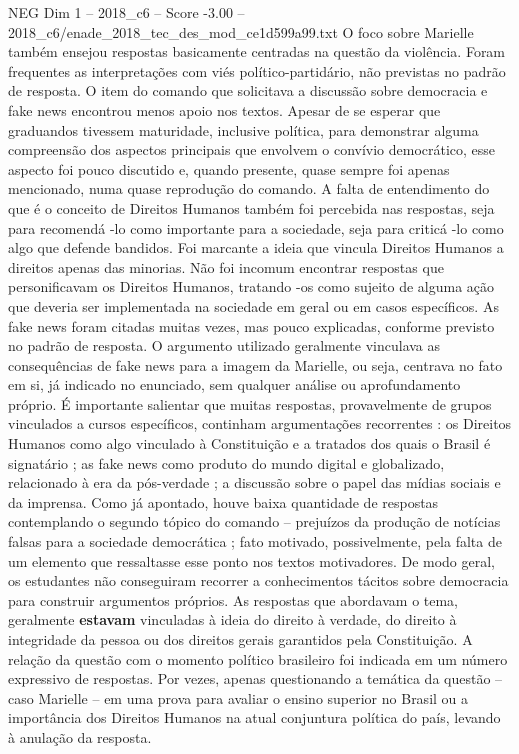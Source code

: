 \begin{textsample}{NEG Dim 1 – 2018\_c6 – Score -3.00 – 2018\_c6/enade\_2018\_tec\_des\_mod\_ce1d599a99.txt}
O foco sobre Marielle também ensejou respostas basicamente centradas na questão da violência.
Foram frequentes as interpretações com viés político-partidário, não previstas no padrão de resposta.
O item do comando que solicitava a discussão sobre democracia e fake news encontrou menos apoio nos textos.
Apesar de se esperar que graduandos tivessem maturidade, inclusive política, para demonstrar alguma compreensão dos aspectos principais que envolvem o convívio democrático, esse aspecto foi pouco discutido e, quando presente, quase sempre foi apenas mencionado, numa quase reprodução do comando.
A falta de entendimento do que é o conceito de Direitos Humanos também foi percebida nas respostas, seja para recomendá -lo como importante para a sociedade, seja para criticá -lo como algo que defende bandidos.
Foi marcante a ideia que vincula Direitos Humanos a direitos apenas das minorias.
Não foi incomum encontrar respostas que personificavam os Direitos Humanos, tratando -os como sujeito de alguma ação que deveria ser implementada na sociedade em geral ou em casos específicos.
As fake news foram citadas muitas vezes, mas pouco explicadas, conforme previsto no padrão de resposta.
O argumento utilizado geralmente vinculava as consequências de fake news para a imagem da Marielle, ou seja, centrava no fato em si, já indicado no enunciado, sem qualquer análise ou aprofundamento próprio.
É importante salientar que muitas respostas, provavelmente de grupos vinculados a cursos específicos, continham argumentações recorrentes : os Direitos Humanos como algo vinculado à Constituição e a tratados dos quais o Brasil é signatário ; as fake news como produto do mundo digital e globalizado, relacionado à era da pós-verdade ; a discussão sobre o papel das mídias sociais e da imprensa.
Como já apontado, houve baixa quantidade de respostas contemplando o segundo tópico do comando – prejuízos da produção de notícias falsas para a sociedade democrática ; fato motivado, possivelmente, pela falta de um elemento que ressaltasse esse ponto nos textos motivadores.
De modo geral, os estudantes não conseguiram recorrer a conhecimentos tácitos sobre democracia para construir argumentos próprios.
As respostas que abordavam o tema, geralmente \textbf{estavam} vinculadas à ideia do direito à verdade, do direito à integridade da pessoa ou dos direitos gerais garantidos pela Constituição.
A relação da questão com o momento político brasileiro foi indicada em um número expressivo de respostas.
Por vezes, apenas questionando a temática da questão – caso Marielle – em uma prova para avaliar o ensino superior no Brasil ou a importância dos Direitos Humanos na atual conjuntura política do país, levando à anulação da resposta.

\end{textsample}
